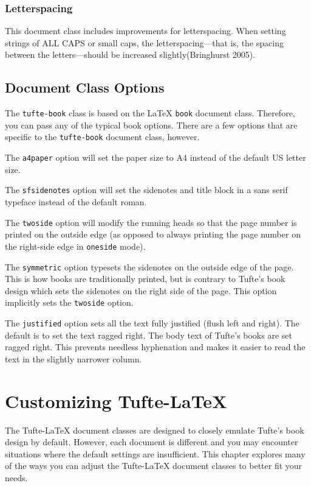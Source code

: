 \documentclass[
  twoside,
  symmetric]{tufte-book}
\begin{document}
\subsection{Letterspacing}\label{sec:letterspacing}

This document class includes improvements for letterspacing. When
setting strings of ALL CAPS or small caps, the letterspacing---that is,
the spacing between the letters---should be increased
slightly(Bringhurst 2005).

\section{Document Class Options}\label{sec:options}

The \texttt{tufte-book} class is based on the LaTeX \texttt{book}
document class. Therefore, you can pass any of the typical book options.
There are a few options that are specific to the \texttt{tufte-book}
document class, however.

The \texttt{a4paper} option will set the paper size to A4 instead of the
default US letter size.

The \texttt{sfsidenotes} option will set the sidenotes and title block
in a sans serif typeface instead of the default roman.

The \texttt{twoside} option will modify the running heads so that the
page number is printed on the outside edge (as opposed to always
printing the page number on the right-side edge in \texttt{oneside}
mode).

The \texttt{symmetric} option typesets the sidenotes on the outside edge
of the page. This is how books are traditionally printed, but is
contrary to Tufte's book design which sets the sidenotes on the right
side of the page. This option implicitly sets the \texttt{twoside}
option.

The \texttt{justified} option sets all the text fully justified (flush
left and right). The default is to set the text ragged right. The body
text of Tufte's books are set ragged right. This prevents needless
hyphenation and makes it easier to read the text in the slightly
narrower column.

\chapter{Customizing Tufte-LaTeX}\label{ch:customizing}

The Tufte-LaTeX document classes are designed to closely emulate Tufte's
book design by default. However, each document is different and you may
encounter situations where the default settings are insufficient. This
chapter explores many of the ways you can adjust the Tufte-LaTeX
document classes to better fit your needs.
\end{document}
